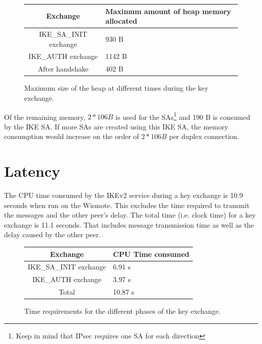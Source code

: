 \documentclass[final,a4paper,twoside,11pt,onecolumn]{report}
\begin{document}
\begin{figure}[h]
\centering
\label{tab:eval-heap}
\begin{tabular}{c|l}
Exchange                      & Maximum amount of heap memory allocated    \\ \hline
IKE\_SA\_INIT exchange        & 930 B                                      \\
IKE\_AUTH exchange            & 1142 B                                     \\
After handshake               & 402 B
\end{tabular}
\caption{Maximum size of the heap at different times during the key exchange.}
\end{figure}

Of the remaining memory, $2 * 106 B$ is used for the SAs\footnote{Keep in mind that IPsec requires one SA for each direction} and 190 B is consumed by the IKE SA. If more SAs are created using this IKE SA, the memory consumption would increase on the order of $2 * 106 B$ per duplex connection.
% 

\section{Latency}
The CPU time consumed by the IKEv2 service during a key exchange is 10.9 seconds when run on the Wismote. This excludes the time required to transmit the messages and the other peer's delay. The total time (i.e. clock time) for a key exchange is 11.1 seconds. That includes message transmission time as well as the delay caused by the other peer.

\begin{figure}[h]
\centering
\begin{tabular}{c|l}                        
Exchange                   & CPU Time consumed     \\ \hline
IKE\_SA\_INIT exchange     & 6.91 s                \\
IKE\_AUTH exchange         & 3.97 s                \\
Total                      & 10.87 s            
\end{tabular}                                   
\caption{Time requirements for the different phases of the key exchange.}
\end{figure}
\end{document}

